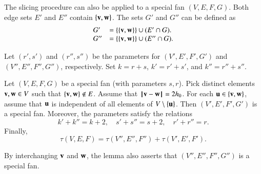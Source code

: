 The slicing procedure can also be applied to a special fan $(V,E,F,G)$.
Both edge sets $E'$ and $E''$ contain $\{{\mathbf v},{\mathbf w}\}$.  The sets $G'$ and $G''$ can be defined
as 
$$
\begin{array}{lll}
G' &= \{\{{\mathbf v},{\mathbf w}\}\} \cup (E'\cap G).\\
G'' &= \{\{{\mathbf v},{\mathbf w}\}\} \cup (E''\cap G).\\
\end{array}
$$ 

Let $(r',s')$ and $(r'',s'')$ be the parameters for $(V',E',F',G')$ and $(V'',E'',F'',G'')$, respectively.
Set $k=r+s$, $k'=r'+s'$, and $k''=r''+s''$.

\begin{lemma}\label{lemma:param-add}  
Let $(V,E,F,G)$ be a special fan (with parameters $s,r$).  
Pick distinct elements ${\mathbf v},{\mathbf w}\in V$  such that $\{{\mathbf v},{\mathbf w}\}\not\in E$.
Assume that ${\hskip0.1em|\hskip-0.15em|\hskip0.1em}{\mathbf v} - {\mathbf w}{\hskip0.1em|\hskip-0.15em|\hskip0.1em}=2{h_0}$.
For each ${\mathbf u}\in \{{\mathbf v},{\mathbf w}\}$, assume that ${\mathbf u}$ is independent of all elements of $V\setminus\{{\mathbf u}\}$.    
Then $(V',E',F',G')$ is a special fan.  Moreover,
the parameters satisfy the relations
$$
k'+k'' = k + 2,\quad s'+s'' = s + 2,\quad r'+r''=r.
$$
Finally,
$$
\tau(V,E,F)= \tau(V'',E'',F'') +\tau(V',E',F').
$$
\end{lemma}

By interchanging ${\mathbf v}$ and ${\mathbf w}$, the lemma also asserts that $(V'',E'',F'',G'')$ is a special fan.

